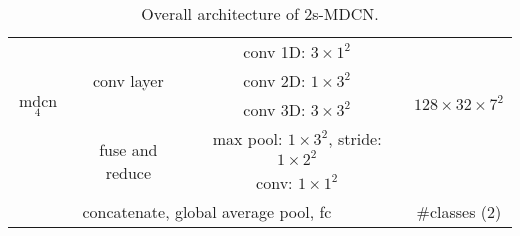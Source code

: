 \begin{table*}[]
\begin{tabular}{|cc|cc|cc|}
\multicolumn{1}{|c|}{\multirow{4}{*}{mdcn$_4$}} & \multicolumn{1}{c|}{\multirow{3}{*}{conv layer}} & \multicolumn{2}{c|}{conv 1D: ${3}\times{{1}^2}$}   & \multicolumn{2}{c|}{\multirow{4}{*}{$128\times{32}\times{7}^2$}}      \\
\multicolumn{1}{|c|}{}                       & \multicolumn{1}{c|}{}                            & \multicolumn{2}{c|}{conv 2D: ${1}\times{{3}^2} $}           & \multicolumn{2}{c|}{}                             \\
\multicolumn{1}{|c|}{}                       & \multicolumn{1}{c|}{}                            & \multicolumn{2}{c|}{conv 3D: ${3}\times{{3}^2} $}           & \multicolumn{2}{c|}{}                             \\ \cline{2-4}

\multicolumn{1}{|c|}{}                                     & \multirow{2}{*}{fuse and reduce} & \multicolumn{2}{c|}{max pool: ${1}\times{{3}^2} $, stride:  ${1}\times{{2}^2} $ }            & \multicolumn{2}{c|}{}     \\ 
\multicolumn{1}{|c|}{}   &       & \multicolumn{2}{c|}{conv: ${1}\times{{1}^2} $ }  & \multicolumn{2}{c|}{} \\ \hline

\multicolumn{4}{|c|}{concatenate, global average pool, fc}                                                                                & \multicolumn{2}{c|}{\#classes (2)}                \\ \hline
\end{tabular}
\caption{ Overall architecture of 2s-MDCN.}

    \label{tab:network_table}
\end{table*}






